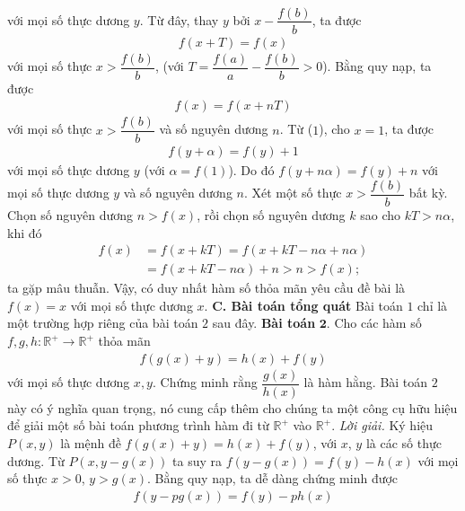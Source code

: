 \begin{multicols}{2}
\begin{align*}
		\end{align*}
		với mọi số thực dương $y$. 
		Từ đây, thay $y$ bởi $x - \dfrac{{f(b)}}{b}$,
		ta được
		\begin{align*}
			f(x + T) = f(x)
		\end{align*}
		với mọi số thực $ x > \dfrac{{f(b)}}{b}$,
		(với $T = \dfrac{{f(a)}}{a} - \dfrac{{f(b)}}{b} > 0$).
		Bằng quy nạp, ta được
		\begin{align*}
			f(x) = f(x + nT)
		\end{align*}
		với mọi số thực $x > \dfrac{{f(b)}}{b}$ và số nguyên dương
		$n$.
		Từ ($1$), cho $x=1$, ta được 
		\begin{align*}
			f\left( {y + \alpha } \right) = f(y) + 1
		\end{align*}
		với mọi số thực dương $y$ (với  $\alpha  = f(1)$). Do đó
		$f\left( {y + n\alpha } \right) = f(y) + n$
		với mọi số thực dương $y$ và số nguyên dương $ n$.
		Xét một số thực  $x > \dfrac{{f(b)}}{b}$ bất kỳ. Chọn số nguyên dương $n>f(x)$,  rồi chọn số nguyên dương $k$ sao cho $kT > n\alpha $, khi đó
		\begin{align*}
			f(x)&= f(x + kT) = f\left( {x + kT - n\alpha  + n\alpha } \right)\\
			&= f\left( {x + kT - n\alpha } \right) + n > n > f(x);
		\end{align*}
		ta gặp mâu thuẫn. 
	\vskip 0.1cm
	Vậy, có duy nhất hàm số thỏa mãn yêu cầu đề bài là
	$f(x) = x$ với mọi số thực dương $x$.
	\vskip 0.1cm
	\textbf{\color{hoccungpi}C. Bài toán tổng quát}
	\vskip 0.1cm
	Bài toán $1$ chỉ là một trường hợp riêng của bài toán 
	$2$ sau đây.
	\vskip 0.1cm
	\textbf{\color{hoccungpi}Bài toán} $\pmb{2.}$
		Cho các hàm số $f, g, h: \mathbb{R}^{+} \rightarrow \mathbb{R}^{+}$ thỏa mãn
		\begin{align*}
			f(g(x)+y)=h(x)+f(y)
		\end{align*} 
		với mọi số thực dương $x, y$. Chứng minh rằng  $\dfrac{g(x)}{h(x)}$ là hàm hằng.
		\vskip 0.1cm
		Bài toán $2$ này có ý nghĩa quan trọng, nó cung cấp thêm cho chúng ta một công cụ hữu hiệu để giải một số bài toán phương trình hàm đi từ 
		$\mathbb{R}^{+}$ vào $\mathbb{R}^{+}$. 
		\vskip 0.1cm
		\textit{Lời giải.}
			Ký hiệu $P(x, y)$ là mệnh đề $f(g(x)+y)=h(x)+f(y)$, với $ x$, $y$ là các số thực dương. 
			\vskip 0.1cm
			Từ $P(x, y-g(x))$ ta suy ra
			$
			f(y-g(x))=f(y)-h(x)$ với mọi số thực  $x>0$, $y>g(x)$.
			Bằng quy nạp, ta dễ dàng chứng minh được
			\begin{align*}
				f(y - pg(x)) = f(y) - ph(x)
			\end{align*}

\end{multicols}
